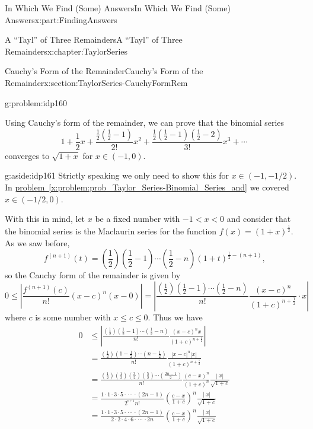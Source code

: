 \documentclass[oneside,10pt,]{book}
\newcommand{\xreffont}{\relax}
\numberwithin{equation}{section}
\newcommand{\abs}[1]{\left|#1\right|}
\newcommand{\lt}{<}
\newcommand{\amp}{&}
\begin{document}
\begin{partptx}{In Which We Find (Some) Answers}{}{In Which We Find (Some) Answers}{}{}{x:part:FindingAnswers}
\begin{chapterptx}{A ``Tayl'' of Three Remainders}{}{A ``Tayl'' of Three Remainders}{}{}{x:chapter:TaylorSeries}
\begin{sectionptx}{Cauchy's Form of the Remainder}{}{Cauchy's Form of the Remainder}{}{}{x:section:TaylorSeries-CauchyFormRem}
\begin{problem}{}{g:problem:idp160}
\end{problem}
Using Cauchy's form of the remainder, we can prove that the binomial series%
\begin{equation*}
1+\frac{1}{2}x+\frac{\frac{1}{2}\left(\frac{1}{2}-1\right)}{2!}x^2+\frac{\frac{1}{2}\left(\frac{1}{2}-1\right)\left(\frac{1}{2}-2\right)}{3!}x^3+\cdots
\end{equation*}
converges to \(\sqrt{1+x}\) for \(x\in(-1,0).\)%
\begin{aside}{}{g:aside:idp161}%
Strictly speaking we only need to show this for \(x\in(-1,-1/2).\)In \hyperref[x:problem:prob_Taylor_Series-Binomial_Series_and]{problem~{\xreffont\ref{x:problem:prob_Taylor_Series-Binomial_Series_and}}} we covered\(x\in (-1/2,0)\).%
\end{aside}
With this in mind, let \(x\) be a fixed number with \(-1\lt x\lt 0\) and consider that the binomial series is the Maclaurin series for the function \(f(x)=(1+x)^{\frac{1}{2}}\). As we saw before,%
\begin{equation*}
f^{(n+1)}(t)=\left(\frac{1}{2}\right)\left(\frac{1}{2}-1\right)\cdots\left(\frac{1}{2}-n\right)\left(1+t\right)^{\frac{1}{2}-(n+1)}\text{,}
\end{equation*}
so the Cauchy form of the remainder is given by%
\begin{equation*}
0\le\abs{\frac{f^{(n+1)}(c)}{n!}(x-c)^n(x-0)}= \abs{\frac{\left(\frac{1}{2}\right)\left(\frac{1}{2}-1\right)\cdots\left(\frac{1}{2}-n\right)}{n!}\frac{(x-c)^n}{(1+c)^{n+\frac{1}{2}}}\cdot x}
\end{equation*}
where \(c\) is some number with \(x\leq c\leq 0\). Thus we have%
\begin{align*}
0\amp \leq\left|\frac{\left(\frac{1}{2}\right)\left(\frac{1}{2}-1\right)\cdots\left(\frac{1}{2}-n\right)}{n!}\frac{(x-c)^nx}{(1+c)^{n+\frac{1}{2}}}\right|\\
\amp =\frac{\left(\frac{1}{2}\right)\left(1-\frac{1}{2}\right)\cdots\left(n-\frac{1}{2}\right)}{n!}\frac{|x-c|^n|x|}{(1+c)^{n+\frac{1}{2}}}\\
\amp =\frac{\left(\frac{1}{2}\right)\left(\frac{1}{2}\right)\left(\frac{3}{2}\right)\left(\frac{5}{2}\right)\cdots\left(\frac{2n-1}{2}\right)}{n!}\frac{(c-x)^n}{(1+c)^n}\frac{|\,x|}{\sqrt{1+c}}\\
\amp =\frac{1\cdot 1\cdot 3\cdot 5\cdot\,\cdots\,\cdot\left(2n-1\right)}{2^{^{n+1}}n!}\left(\frac{c-x}{1+c}\right)^n\frac{|\,x|}{\sqrt{1+c}}\\
\amp =\frac{1\cdot 1\cdot 3\cdot 5\cdot\,\cdots\,\cdot\left(2n-1\right)}{2\cdot 2\cdot 4\cdot 6\cdot\,\cdots\,\cdot 2n}\left(\frac{c-x}{1+c}\right)^n\frac{|\,x|}{\sqrt{1+c}}\\

\end{align*}
\end{sectionptx}
\end{chapterptx}
\end{partptx}
\end{document}
